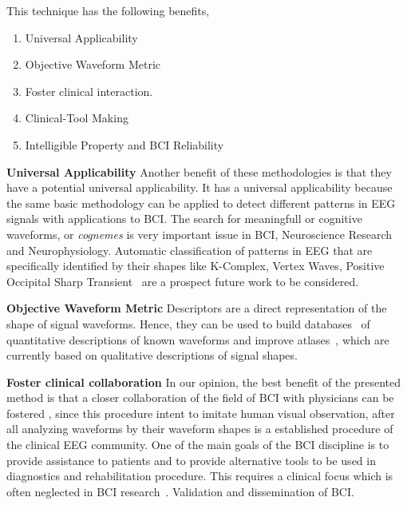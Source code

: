 

This technique has the following benefits,

\begin{enumerate}
\item Universal Applicability
\item Objective Waveform Metric
\item Foster clinical interaction.
\item Clinical-Tool Making
\item Intelligible Property and BCI Reliability
\end{enumerate}

\textbf{Universal Applicability}
Another benefit of these methodologies is that they have a potential universal applicability. It has a universal applicability because the same basic methodology can be applied to detect different patterns in EEG signals with applications to BCI.   The search for meaningfull or cognitive waveforms, or \textit{cognemes} is very important issue in BCI, Neuroscience Research and Neurophysiology. Automatic classification of patterns in EEG that are specifically identified by their shapes like K-Complex, Vertex Waves, Positive Occipital Sharp Transient~\cite{Hartman2005} are a prospect future work to be considered. 

\textbf{Objective Waveform Metric}
Descriptors are a direct representation of the shape of signal waveforms. Hence,  they can be used to build databases~\cite{Chavarriaga2017} of quantitative descriptions of known waveforms and improve atlases~\cite{Hartman2005}, which are currently based on qualitative descriptions of signal shapes.

\textbf{Foster clinical collaboration}
In our opinion, the best benefit of the presented method is that a closer collaboration of the field of BCI with physicians can be fostered \cite{Chavarriaga2017}, since this procedure intent to imitate human visual observation, after all analyzing waveforms by their waveform shapes is a established procedure of the clinical EEG community. One of the main goals of the BCI discipline is to provide assistance to patients and to provide alternative tools to be used in diagnostics and rehabilitation procedure.  This requires a clinical focus which is often neglected in BCI research~\cite{Chavarriaga2017}.  Validation and dissemination of BCI.

